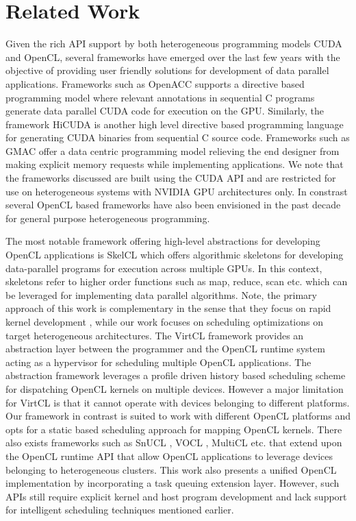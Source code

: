 \section{Related Work}
\par Given the rich API support by both heterogeneous programming models CUDA and OpenCL, several frameworks have emerged over the last few years with the objective of providing user friendly solutions for development of data parallel applications. Frameworks such as OpenACC \cite{openacc} supports a directive based programming model where relevant annotations in sequential C programs generate data parallel CUDA code for execution on the GPU. Similarly, the framework  HiCUDA \cite{hicuda} is another high level directive based programming language for generating CUDA binaries from sequential C source code. Frameworks such as GMAC \cite{gelado} offer a data centric programming model relieving the end designer from making explicit memory requests while implementing applications. We note that the frameworks discussed are built using the CUDA API and are restricted for use on heterogeneous systems with NVIDIA GPU architectures only. In constrast several OpenCL based frameworks have also been envisioned in the past decade for general purpose heterogeneous programming. 
	\par The most notable framework offering high-level abstractions for developing OpenCL applications is SkelCL \cite{skelCL} which offers algorithmic skeletons for developing data-parallel programs for execution across multiple GPUs. In this context, skeletons refer to higher order functions such as map, reduce, scan etc. which can be leveraged for implementing data parallel algorithms. Note, the primary approach of this work is complementary in the sense that they focus on rapid kernel development , while our work focuses on scheduling optimizations on target heterogeneous architectures. The VirtCL framework \cite{virtcl} provides an abstraction layer between the programmer and the OpenCL runtime system acting as a hypervisor for scheduling multiple OpenCL applications. The abstraction framework leverages a profile driven history based scheduling scheme for dispatching OpenCL kernels on multiple devices.   However a major limitation for VirtCL is that it cannot operate with devices belonging to different platforms. Our framework in contrast is suited to work with different OpenCL platforms and opts for a static based scheduling approach for mapping OpenCL kernels. There also exists frameworks such as SnUCL \cite{snucl}, VOCL \cite{vocl}, MultiCL \cite{multicl} etc. that extend upon the OpenCL runtime API that allow OpenCL applications to leverage devices belonging to heterogeneous clusters.  This work also presents a unified OpenCL implementation by incorporating a task queuing extension layer. However, such APIs still require explicit kernel and host program development and lack support for intelligent scheduling techniques mentioned earlier. 
